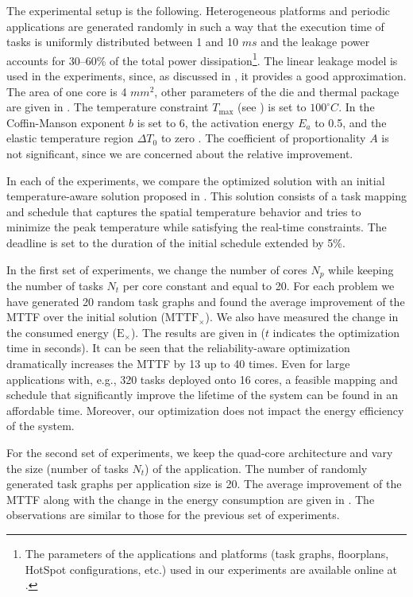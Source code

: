 The experimental setup is the following. Heterogeneous platforms and periodic
applications are generated randomly \cite{dick1998} in such a way that the
execution time of tasks is uniformly distributed between 1 and 10 $ms$ and the
leakage power accounts for 30--60\% of the total power dissipation\footnote{The
parameters of the applications and platforms (task graphs, floorplans, HotSpot
configurations, etc.) used in our experiments are available online at
\cite{liu2011}.}. The linear leakage model is used in the experiments, since, as
discussed in , it provides a good
approximation. The area of one core is 4 $mm^2$, other parameters of the die and
thermal package are given in . The temperature constraint
$T_\text{max}$ (see ) is set to $100^\circ C$. In
 the Coffin-Manson exponent $b$ is set to 6, the
activation energy $E_a$ to 0.5, and the elastic temperature region $\Delta T_0$
to zero \cite{jedec2010}. The coefficient of proportionality $A$ is not
significant, since we are concerned about the relative improvement.

In each of the experiments, we compare the optimized solution with an initial
temperature-aware solution proposed in \cite{xie2006}. This solution consists of
a task mapping and schedule that captures the spatial temperature behavior and
tries to minimize the peak temperature while satisfying the real-time
constraints. The deadline is set to the duration of the initial schedule
extended by 5\%.

In the first set of experiments, we change the number of cores $N_p$ while
keeping the number of tasks $N_t$ per core constant and equal to 20. For each
problem we have generated 20 random task graphs and found the average
improvement of the MTTF over the initial solution ($\scriptstyle
\text{MTTF}_\times$). We also have measured the change in the consumed energy
($\scriptstyle \text{E}_\times$). The results are given in 
($t$ indicates the optimization time in seconds). It can be seen that the
reliability-aware optimization dramatically increases the MTTF by 13 up to 40
times. Even for large applications with, e.g., 320 tasks deployed onto 16 cores,
a feasible mapping and schedule that significantly improve the lifetime of the
system can be found in an affordable time. Moreover, our optimization does not
impact the energy efficiency of the system.

For the second set of experiments, we keep the quad-core architecture and vary
the size (number of tasks $N_t$) of the application. The number of randomly
generated task graphs per application size is 20. The average improvement of the
MTTF along with the change in the energy consumption are given in
. The observations are similar to those for the previous set of
experiments.


